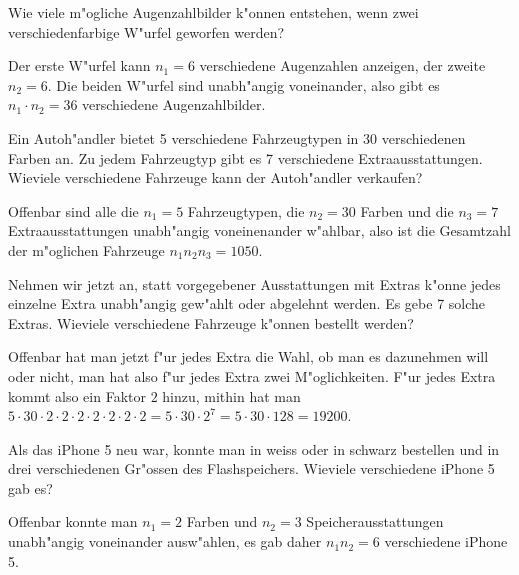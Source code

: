 \begin{beispiele}
\item Wie viele m"ogliche Augenzahlbilder k"onnen entstehen, wenn zwei
verschiedenfarbige W"urfel geworfen werden?

\begin{loesung}
Der erste W"urfel kann $n_1=6$ verschiedene Augenzahlen anzeigen,
der zweite $n_2=6$. Die beiden W"urfel sind unabh"angig voneinander,
also gibt es $n_1\cdot n_2=36$ verschiedene Augenzahlbilder.
\end{loesung}


\item Ein Autoh"andler bietet 5 verschiedene Fahrzeugtypen in 30
verschiedenen Farben an. Zu jedem Fahrzeugtyp gibt es 7 verschiedene
Extraausstattungen. Wieviele
verschiedene Fahrzeuge kann der Autoh"andler verkaufen?

\begin{loesung}
Offenbar sind alle die $n_1=5$ Fahrzeugtypen, die $n_2=30$ Farben
und die $n_3=7$ Extraausstattungen unabh"angig voneinenander w"ahlbar, also ist
die Gesamtzahl der m"oglichen Fahrzeuge $n_1n_2n_3=1050$.
\end{loesung}

\item Nehmen wir jetzt an, statt vorgegebener Ausstattungen mit
Extras k"onne jedes einzelne Extra unabh"angig gew"ahlt oder
abgelehnt werden. Es gebe 7 solche Extras. Wieviele verschiedene
Fahrzeuge k"onnen bestellt werden?

\begin{loesung}
Offenbar hat man jetzt f"ur jedes Extra die Wahl, ob man es dazunehmen
will oder nicht, man hat also f"ur jedes Extra zwei M"oglichkeiten.
F"ur jedes Extra kommt also ein Faktor $2$ hinzu, mithin hat man
$5\cdot 30
\cdot 2
\cdot 2
\cdot 2
\cdot 2
\cdot 2
\cdot 2
\cdot 2
=5\cdot 30\cdot 2^7=5\cdot 30 \cdot 128=19200$.
\end{loesung}

\item Als das iPhone 5 neu war, konnte man in weiss oder in schwarz
bestellen und in drei verschiedenen
Gr"ossen des Flashspeichers. Wieviele verschiedene iPhone 5 gab es?

\begin{loesung}
Offenbar konnte man $n_1=2$ Farben und $n_2=3$ Speicherausstattungen
unabh"angig voneinander ausw"ah\-len, es gab
daher $n_1n_2=6$ verschiedene iPhone 5.
\end{loesung}

\end{beispiele}

